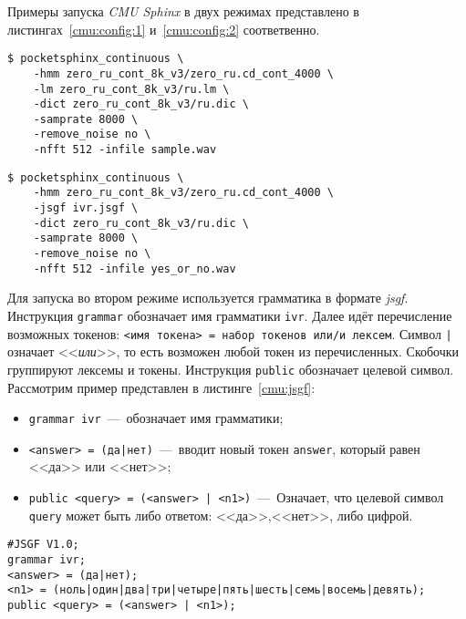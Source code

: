 Примеры запуска \textit{CMU Sphinx} в двух режимах представлено в
листингах~\ref{cmu:config:1} и~\ref{cmu:config:2} соответвенно.\\

\begin{lstlisting}[caption={Запуск \textit{CMU Sphinx}. Вариант 1},label={cmu:config:1}]
$ pocketsphinx_continuous \
    -hmm zero_ru_cont_8k_v3/zero_ru.cd_cont_4000 \
    -lm zero_ru_cont_8k_v3/ru.lm \
    -dict zero_ru_cont_8k_v3/ru.dic \
    -samprate 8000 \
    -remove_noise no \
    -nfft 512 -infile sample.wav
\end{lstlisting}

\begin{lstlisting}[caption={Запуск \textit{CMU Sphinx}. Вариант 2},label={cmu:config:2}]
$ pocketsphinx_continuous \
    -hmm zero_ru_cont_8k_v3/zero_ru.cd_cont_4000 \
    -jsgf ivr.jsgf \
    -dict zero_ru_cont_8k_v3/ru.dic \
    -samprate 8000 \
    -remove_noise no \
    -nfft 512 -infile yes_or_no.wav
\end{lstlisting}

Для запуска во втором режиме используется грамматика в формате \textit{jsgf}.
Инструкция \texttt{grammar} обозначает имя грамматики \texttt{ivr}. Далее
идёт перечисление возможных токенов: \texttt{<имя токена> = набор токенов или/и лексем}.
Символ \texttt{|} означает <<\textit{или}>>, то есть возможен любой токен из перечисленных.
Скобочки группируют лексемы и токены. Инструкция \texttt{public} обозначает целевой символ.
Рассмотрим пример представлен в листинге~\ref{cmu:jsgf}:

\begin{itemize}
    \item \texttt{grammar ivr}~---~обозначает имя грамматики;
    \item \texttt{<answer> = (да|нет)}~---~вводит новый токен \texttt{answer},
    который равен <<да>> или <<нет>>;
    \item \texttt{public <query> = (<answer> | <n1>)}~---~Означает, что целевой
        символ \texttt{query} может быть либо ответом: <<да>>,<<нет>>, либо цифрой.
\end{itemize}

{
\captionof{lstlisting}{Пример грамматики}\label{cmu:jsgf}
\vspace{-10pt}
\begin{Verbatim}[fontsize=\footnotesize,xleftmargin=8mm]
#JSGF V1.0;
grammar ivr;
<answer> = (да|нет);
<n1> = (ноль|один|два|три|четыре|пять|шесть|семь|восемь|девять);
public <query> = (<answer> | <n1>);
\end{Verbatim}
}

